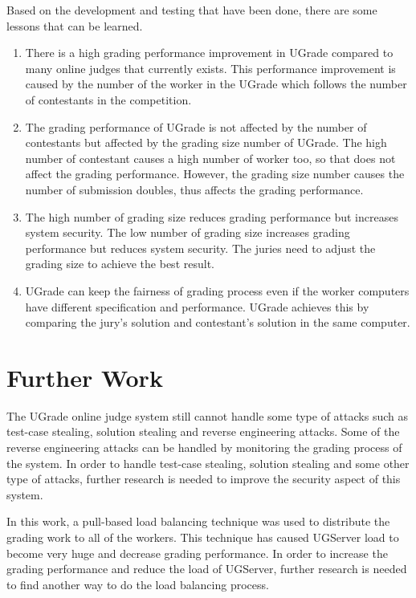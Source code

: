 \documentclass[conference,a4paper]{IEEEtran}
\begin{document}
Based on the development and testing that have been done, there are some lessons that can be learned.
\begin{enumerate}
    \item There is a high grading performance improvement in UGrade compared to many online judges that  currently exists. This performance improvement is caused by the number of the worker in the UGrade which follows the number of contestants in the competition.
    \item The grading performance of UGrade is not affected by the number of contestants but affected by the grading size number of UGrade. The high number of contestant causes a high number of worker too, so that does not affect the grading performance. However, the grading size number causes the number of submission doubles, thus affects the grading performance.
    \item The high number of grading size reduces grading performance but increases system security. The low number of grading size increases grading performance but reduces system security. The juries need to adjust the grading size to achieve the best result.
    \item UGrade can keep the fairness of grading process even if the worker computers have different specification and performance. UGrade achieves this by comparing the jury's solution and contestant's solution in the same computer.
\end{enumerate}

\section{Further Work}

The UGrade online judge system still cannot handle some type of attacks such as test-case stealing, solution stealing and reverse engineering attacks. Some of the reverse engineering attacks can be handled by monitoring the grading process of the system. In order to handle test-case stealing, solution stealing and some other type of attacks, further research is needed to improve the security aspect of this system. 

In this work, a pull-based load balancing technique was used to distribute the grading work to all of the workers. This technique has caused UGServer load to become very huge and decrease grading performance. In order to increase the grading performance and reduce the load of UGServer, further research is needed to find another way to do the load balancing process.
\end{document}
